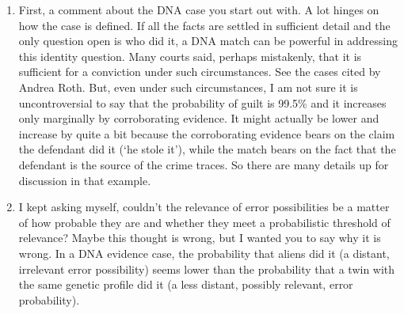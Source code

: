 \documentclass[
  11pt,
  dvipsnames,enabledeprecatedfontcommands]{scrartcl}
\begin{document}
\begin{enumerate}
\def\labelenumi{\arabic{enumi})}
\item
  First, a comment about the DNA case you start out with. A lot hinges
  on how the case is defined. If all the facts are settled in sufficient
  detail and the only question open is who did it, a DNA match can be
  powerful in addressing this identity question. Many courts said,
  perhaps mistakenly, that it is sufficient for a conviction under such
  circumstances. See the cases cited by Andrea Roth. But, even under
  such circumstances, I am not sure it is uncontroversial to say that
  the probability of guilt is 99.5\% and it increases only marginally by
  corroborating evidence. It might actually be lower and increase by
  quite a bit because the corroborating evidence bears on the claim the
  defendant did it (`he stole it'), while the match bears on the fact
  that the defendant is the source of the crime traces. So there are
  many details up for discussion in that example.
\item
  I kept asking myself, couldn't the relevance of error possibilities be
  a matter of how probable they are and whether they meet a
  probabilistic threshold of relevance? Maybe this thought is wrong, but
  I wanted you to say why it is wrong. In a DNA evidence case, the
  probability that aliens did it (a distant, irrelevant error
  possibility) seems lower than the probability that a twin with the
  same genetic profile did it (a less distant, possibly relevant, error
  probability).


\end{enumerate}
\end{document}
